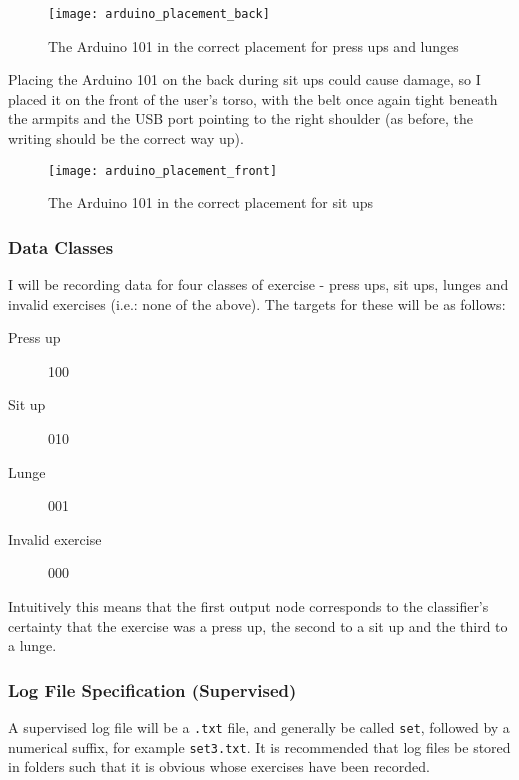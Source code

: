 \documentclass[a4paper]{article}
\begin{document}
\begin{figure}[H]
    \centering
        \texttt{[image: arduino\_placement\_back]}
        \caption{The Arduino 101 in the correct placement for press ups and lunges}
        \label{fig:ar_placement_back}
\end{figure}

Placing the Arduino 101 on the back during sit ups could cause damage, so I placed it on the front of the user's torso, with the belt once again tight beneath the armpits and the USB port pointing to the right shoulder (as before, the writing should be the correct way up).

\begin{figure}[H]
    \centering
        \texttt{[image: arduino\_placement\_front]}
        \caption{The Arduino 101 in the correct placement for sit ups}
        \label{fig:ar_placement_front}
\end{figure}

\subsubsection{Data Classes}
\label{subsubsec:dc_dc_classes}

I will be recording data for four classes of exercise - press ups, sit ups, lunges and invalid exercises (i.e.: none of the above). The targets for these will be as follows:

\begin{description}
\item[Press up] 100
\item[Sit up] 010
\item[Lunge] 001
\item[Invalid exercise] 000
\end{description}

Intuitively this means that the first output node corresponds to the classifier's certainty that the exercise was a press up, the second to a sit up and the third to a lunge. 

\newpage
\subsubsection{Log File Specification (Supervised)}

A supervised log file will be a \lstinline{.txt} file, and generally be called \lstinline{set}, followed by a numerical suffix, for example \lstinline{set3.txt}. It is recommended that log files be stored in folders such that it is obvious whose exercises have been recorded.
\end{document}
